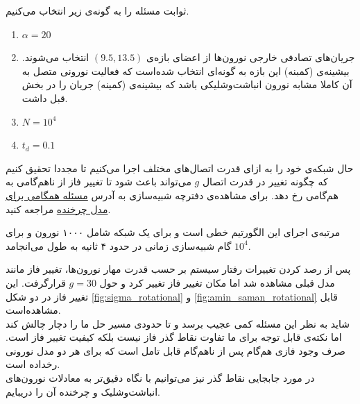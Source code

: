 ثوابت مسئله را به گونه‌ی زیر انتخاب می‌کنیم.
\begin{tcolorbox}[colback=green!5!white,colframe=green!75!black]
	\begin{enumerate}[*]
		\item
		$\alpha = 20$
		\item
		جریان‌های تصادفی خارجی نورون‌ها از اعضای بازه‌ی $(9.5,13.5)$ انتخاب می‌شوند. بیشینه‌ی (کمبنه) این بازه به گونه‌ای انتخاب شده‌است که فعالیت نورونی متصل به آن‌ کاملا مشابه نورون انباشت‌وشلیکی باشد که بیشینه‌ی (کمینه) جریان را در بخش قبل داشت. 
		\item
		$N = 10^4$
		\item
		$t_d = 0.1$ 
	\end{enumerate}
\end{tcolorbox}
حال شبکه‌ی خود را به ازای قدرت اتصال‌های مختلف اجرا می‌کنیم تا مجددا تحقیق کنیم که چگونه تغییر در قدرت اتصال $g$ می‌تواند باعث شود تا تغییر فاز از ناهم‌گامی به هم‌گامی رخ دهد. برای مشاهده‌ی دفترچه شبیه‌سازی به آدرس 
\href{https://github.com/mmehrani/master_thesis/tree/main/scripts/rotational_model}{مسئله همگامی برای مدل چرخنده}
مراجعه کنید.

مرتبه‌ی اجرای این الگورتیم خطی است و برای یک شبکه شامل ۱۰۰۰ نورون و برای $10^4$ گام شبیه‌سازی زمانی در حدود ۴ ثانیه به طول می‌انجامد. 


پس از رصد کردن تغییرات رفتار سیستم بر حسب قدرت مهار نورون‌ها، تغییر فاز مانند مدل قبلی مشاهده شد اما مکان تغییر فاز تغییر کرد و حول $g=30$ قرارگرفت. این تغییر فاز در دو شکل \ref{fig:sigma_rotational} و \ref{fig:amin_saman_rotational}  قابل مشاهده‌است.\\
شاید به نظر این مسئله کمی عجیب برسد و تا حدودی مسیر حل ما را دچار چالش کند اما نکته‌ی قابل توجه برای ما تفاوت نقاط گذر فاز نیست بلکه کیفیت تغییر فاز است. صرف وجود فازی هم‌گام پس از نا‌هم‌گام قابل تامل است که برای هر دو مدل نورونی رخداده است.\\
در مورد جابجایی نقاط گذر نیز می‌توانیم با نگاه دقیق‌تر به معادلات نورون‌های انباشت‌وشلیک و چرخنده آن را دریبایم.\\

